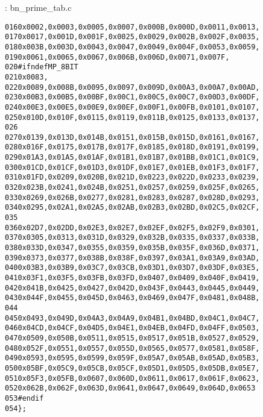 \documentclass[b5paper]{book}
\begin{document}
\vspace{+3mm}\begin{small}
\hspace{-5.1mm}{\bf File}: bn\_prime\_tab.c
\vspace{-3mm}
\begin{alltt}
016     0x0002, 0x0003, 0x0005, 0x0007, 0x000B, 0x000D, 0x0011, 0x0013,
017     0x0017, 0x001D, 0x001F, 0x0025, 0x0029, 0x002B, 0x002F, 0x0035,
018     0x003B, 0x003D, 0x0043, 0x0047, 0x0049, 0x004F, 0x0053, 0x0059,
019     0x0061, 0x0065, 0x0067, 0x006B, 0x006D, 0x0071, 0x007F,
020   #ifndef MP_8BIT
021     0x0083,
022     0x0089, 0x008B, 0x0095, 0x0097, 0x009D, 0x00A3, 0x00A7, 0x00AD,
023     0x00B3, 0x00B5, 0x00BF, 0x00C1, 0x00C5, 0x00C7, 0x00D3, 0x00DF,
024     0x00E3, 0x00E5, 0x00E9, 0x00EF, 0x00F1, 0x00FB, 0x0101, 0x0107,
025     0x010D, 0x010F, 0x0115, 0x0119, 0x011B, 0x0125, 0x0133, 0x0137,
026   
027     0x0139, 0x013D, 0x014B, 0x0151, 0x015B, 0x015D, 0x0161, 0x0167,
028     0x016F, 0x0175, 0x017B, 0x017F, 0x0185, 0x018D, 0x0191, 0x0199,
029     0x01A3, 0x01A5, 0x01AF, 0x01B1, 0x01B7, 0x01BB, 0x01C1, 0x01C9,
030     0x01CD, 0x01CF, 0x01D3, 0x01DF, 0x01E7, 0x01EB, 0x01F3, 0x01F7,
031     0x01FD, 0x0209, 0x020B, 0x021D, 0x0223, 0x022D, 0x0233, 0x0239,
032     0x023B, 0x0241, 0x024B, 0x0251, 0x0257, 0x0259, 0x025F, 0x0265,
033     0x0269, 0x026B, 0x0277, 0x0281, 0x0283, 0x0287, 0x028D, 0x0293,
034     0x0295, 0x02A1, 0x02A5, 0x02AB, 0x02B3, 0x02BD, 0x02C5, 0x02CF,
035   
036     0x02D7, 0x02DD, 0x02E3, 0x02E7, 0x02EF, 0x02F5, 0x02F9, 0x0301,
037     0x0305, 0x0313, 0x031D, 0x0329, 0x032B, 0x0335, 0x0337, 0x033B,
038     0x033D, 0x0347, 0x0355, 0x0359, 0x035B, 0x035F, 0x036D, 0x0371,
039     0x0373, 0x0377, 0x038B, 0x038F, 0x0397, 0x03A1, 0x03A9, 0x03AD,
040     0x03B3, 0x03B9, 0x03C7, 0x03CB, 0x03D1, 0x03D7, 0x03DF, 0x03E5,
041     0x03F1, 0x03F5, 0x03FB, 0x03FD, 0x0407, 0x0409, 0x040F, 0x0419,
042     0x041B, 0x0425, 0x0427, 0x042D, 0x043F, 0x0443, 0x0445, 0x0449,
043     0x044F, 0x0455, 0x045D, 0x0463, 0x0469, 0x047F, 0x0481, 0x048B,
044   
045     0x0493, 0x049D, 0x04A3, 0x04A9, 0x04B1, 0x04BD, 0x04C1, 0x04C7,
046     0x04CD, 0x04CF, 0x04D5, 0x04E1, 0x04EB, 0x04FD, 0x04FF, 0x0503,
047     0x0509, 0x050B, 0x0511, 0x0515, 0x0517, 0x051B, 0x0527, 0x0529,
048     0x052F, 0x0551, 0x0557, 0x055D, 0x0565, 0x0577, 0x0581, 0x058F,
049     0x0593, 0x0595, 0x0599, 0x059F, 0x05A7, 0x05AB, 0x05AD, 0x05B3,
050     0x05BF, 0x05C9, 0x05CB, 0x05CF, 0x05D1, 0x05D5, 0x05DB, 0x05E7,
051     0x05F3, 0x05FB, 0x0607, 0x060D, 0x0611, 0x0617, 0x061F, 0x0623,
052     0x062B, 0x062F, 0x063D, 0x0641, 0x0647, 0x0649, 0x064D, 0x0653
053   #endif
054   \};
\end{alltt}
\end{small}
\end{document}
